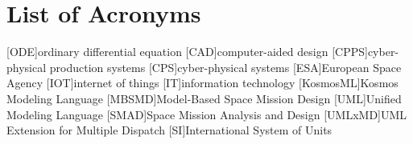 \chapter*{List of Acronyms}
\begin{acronym}
    [ODE]{ordinary differential equation}
    [CAD]{computer-aided design}
    [CPPS]{cyber-physical production systems}
    [CPS]{cyber-physical systems}
    [ESA]{European Space Agency}
    [IOT]{internet of things}
    [IT]{information technology}
    [KosmosML]{Kosmos Modeling Language}
    [MBSMD]{Model-Based Space Mission Design}
    [UML]{Unified Modeling Language}
    [SMAD]{Space Mission Analysis and Design}
    [UMLxMD]{UML Extension for Multiple Dispatch}
    [SI]{International System of Units }
\end{acronym}
